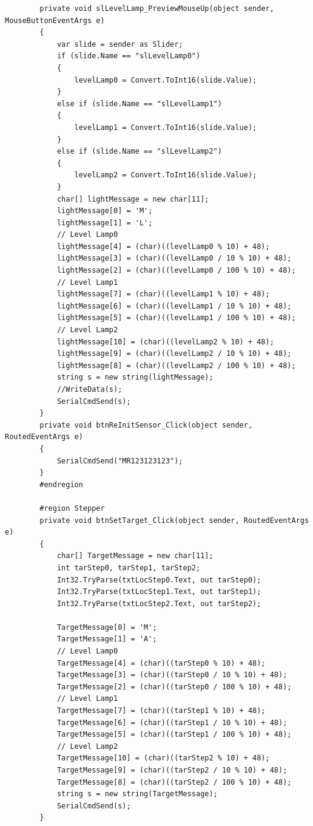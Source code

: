 \begin{lstlisting}
        private void slLevelLamp_PreviewMouseUp(object sender, MouseButtonEventArgs e)
        {
            var slide = sender as Slider;
            if (slide.Name == "slLevelLamp0") 
            {
                levelLamp0 = Convert.ToInt16(slide.Value);
            }
            else if (slide.Name == "slLevelLamp1")
            {
                levelLamp1 = Convert.ToInt16(slide.Value);
            }
            else if (slide.Name == "slLevelLamp2")
            {
                levelLamp2 = Convert.ToInt16(slide.Value);
            }
            char[] lightMessage = new char[11];
            lightMessage[0] = 'M';
            lightMessage[1] = 'L';
            // Level Lamp0
            lightMessage[4] = (char)((levelLamp0 % 10) + 48);
            lightMessage[3] = (char)((levelLamp0 / 10 % 10) + 48);
            lightMessage[2] = (char)((levelLamp0 / 100 % 10) + 48);
            // Level Lamp1
            lightMessage[7] = (char)((levelLamp1 % 10) + 48);
            lightMessage[6] = (char)((levelLamp1 / 10 % 10) + 48);
            lightMessage[5] = (char)((levelLamp1 / 100 % 10) + 48);
            // Level Lamp2
            lightMessage[10] = (char)((levelLamp2 % 10) + 48);
            lightMessage[9] = (char)((levelLamp2 / 10 % 10) + 48);
            lightMessage[8] = (char)((levelLamp2 / 100 % 10) + 48);
            string s = new string(lightMessage);
            //WriteData(s);
            SerialCmdSend(s);
        }
        private void btnReInitSensor_Click(object sender, RoutedEventArgs e)
        {
            SerialCmdSend("MR123123123");
        }
        #endregion

        #region Stepper
        private void btnSetTarget_Click(object sender, RoutedEventArgs e)
        {
            char[] TargetMessage = new char[11];
            int tarStep0, tarStep1, tarStep2;
            Int32.TryParse(txtLocStep0.Text, out tarStep0);
            Int32.TryParse(txtLocStep1.Text, out tarStep1);
            Int32.TryParse(txtLocStep2.Text, out tarStep2);

            TargetMessage[0] = 'M';
            TargetMessage[1] = 'A';
            // Level Lamp0
            TargetMessage[4] = (char)((tarStep0 % 10) + 48);
            TargetMessage[3] = (char)((tarStep0 / 10 % 10) + 48);
            TargetMessage[2] = (char)((tarStep0 / 100 % 10) + 48);
            // Level Lamp1
            TargetMessage[7] = (char)((tarStep1 % 10) + 48);
            TargetMessage[6] = (char)((tarStep1 / 10 % 10) + 48);
            TargetMessage[5] = (char)((tarStep1 / 100 % 10) + 48);
            // Level Lamp2
            TargetMessage[10] = (char)((tarStep2 % 10) + 48);
            TargetMessage[9] = (char)((tarStep2 / 10 % 10) + 48);
            TargetMessage[8] = (char)((tarStep2 / 100 % 10) + 48);
            string s = new string(TargetMessage);
            SerialCmdSend(s);
        }


\end{lstlisting}
